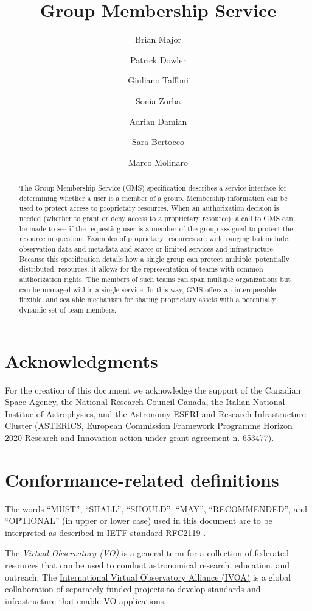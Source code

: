 \documentclass[11pt,a4paper]{ivoa}
\title{Group Membership Service}
\author{Brian Major}
\author{Patrick Dowler}
\author{Giuliano Taffoni}
\author{Sonia Zorba}
\author{Adrian Damian}
\author{Sara Bertocco}
\author{Marco Molinaro}
\begin{document}
\begin{abstract}

The Group Membership Service (GMS) specification describes a service interface for determining whether a user is a member of a group.  Membership information can be used to protect access to proprietary resources.  When an authorization decision is needed (whether to grant or deny access to a proprietary resource), a call to GMS can be made to see if the requesting user is a member of the group assigned to protect the resource in question.  Examples of proprietary resources are wide ranging but include: observation data and metadata and scarce or limited services and infrastructure.  Because this specification details how a single group can protect multiple, potentially distributed, resources, it allows for the representation of teams with common authorization rights.  The members of such teams can span multiple organizations but can be managed within a single service.  In this way, GMS offers an interoperable, flexible, and scalable mechanism for sharing proprietary assets with a potentially dynamic set of team members.

\end{abstract}

\section*{Acknowledgments}
For the creation of this document we acknowledge the support of the Canadian Space Agency, the National Research Council Canada, the Italian National Institue of Astrophysics, and the Astronomy ESFRI and Research Infrastructure Cluster (ASTERICS, European Commission Framework Programme Horizon 2020 Research and Innovation action under grant agreement n. 653477).

\section*{Conformance-related definitions}

The words ``MUST'', ``SHALL'', ``SHOULD'', ``MAY'', ``RECOMMENDED'', and
``OPTIONAL'' (in upper or lower case) used in this document are to be
interpreted as described in IETF standard RFC2119 \citep{std:RFC2119}.

The \emph{Virtual Observatory (VO)} is a
general term for a collection of federated resources that can be used
to conduct astronomical research, education, and outreach.
The \href{http://www.ivoa.net}{International
Virtual Observatory Alliance (IVOA)} is a global
collaboration of separately funded projects to develop standards and
infrastructure that enable VO applications.
\end{document}
